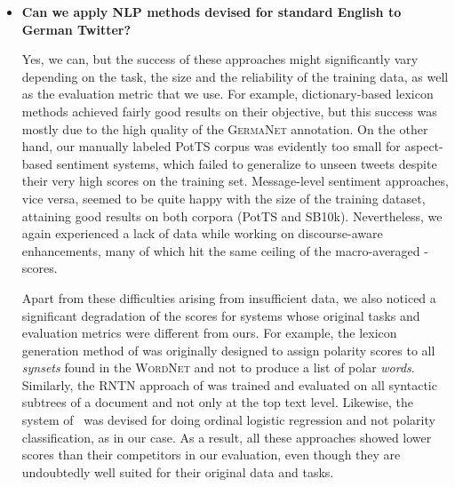 \begin{itemize}
  \item\textbf{Can we apply NLP methods devised for standard English
    to German Twitter?}

    Yes, we can, but the success of these approaches might
    significantly vary depending on the task, the size and the
    reliability of the training data, as well as the evaluation metric
    that we use. For example, dictionary-based lexicon methods
    achieved fairly good results on their objective, but this success
    was mostly due to the high quality of the \textsc{GermaNet}
    annotation.  On the other hand, our manually labeled PotTS corpus
    was evidently too small for aspect-based sentiment systems, which
    failed to generalize to unseen tweets despite their very high
    scores on the training set.  Message-level sentiment approaches,
    vice versa, seemed to be quite happy with the size of the training
    dataset, attaining good results on both corpora (PotTS and SB10k).
    Nevertheless, we again experienced a lack of data while working on
    discourse-aware enhancements, many of which hit the same ceiling
    of the macro-averaged \F{}-scores.

    Apart from these difficulties arising from insufficient data, we
    also noticed a significant degradation of the scores for systems
    whose original tasks and evaluation metrics were different from
    ours.  For example, the lexicon generation method of
    \citet{Esuli:05} was originally designed to assign polarity scores
    to all \emph{synsets} found in the \textsc{WordNet} and not to
    produce a list of polar \emph{words}.  Similarly, the RNTN
    approach of \citet{Socher:13} was trained and evaluated on all
    syntactic subtrees of a document and not only at the top text
    level.  Likewise, the system of~\citet{Yessenalina:11} was devised
    for doing ordinal logistic regression and not polarity
    classification, as in our case.  As a result, all these approaches
    showed lower scores than their competitors in our evaluation, even
    though they are undoubtedly well suited for their original data
    and tasks.


\end{itemize}
